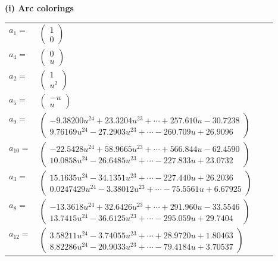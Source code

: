 \documentclass[1p]{elsarticle_modified}
\theoremstyle{definition}
\begin{document}
\flushleft \textbf{(i) Arc colorings}\\
\begin{tabular}{m{7pt} m{180pt} m{7pt} m{180pt} }
\flushright $a_{1}=$&$\begin{pmatrix}1\\0\end{pmatrix}$ \\
\flushright $a_{4}=$&$\begin{pmatrix}0\\u\end{pmatrix}$ \\
\flushright $a_{2}=$&$\begin{pmatrix}1\\u^2\end{pmatrix}$ \\
\flushright $a_{5}=$&$\begin{pmatrix}- u\\u\end{pmatrix}$ \\
\flushright $a_{9}=$&$\begin{pmatrix}-9.38200 u^{24}+23.3204 u^{23}+\cdots+257.610 u-30.7238\\9.76169 u^{24}-27.2903 u^{23}+\cdots-260.709 u+26.9096\end{pmatrix}$ \\
\flushright $a_{10}=$&$\begin{pmatrix}-22.5428 u^{24}+58.9665 u^{23}+\cdots+566.844 u-62.4590\\10.0858 u^{24}-26.6485 u^{23}+\cdots-227.833 u+23.0732\end{pmatrix}$ \\
\flushright $a_{3}=$&$\begin{pmatrix}15.1635 u^{24}-34.1351 u^{23}+\cdots-227.440 u+26.2036\\0.0247429 u^{24}-3.38012 u^{23}+\cdots-75.5561 u+6.67925\end{pmatrix}$ \\
\flushright $a_{8}=$&$\begin{pmatrix}-13.3618 u^{24}+32.6426 u^{23}+\cdots+291.960 u-33.5546\\13.7415 u^{24}-36.6125 u^{23}+\cdots-295.059 u+29.7404\end{pmatrix}$ \\
\flushright $a_{12}=$&$\begin{pmatrix}3.58211 u^{24}-3.74055 u^{23}+\cdots+28.9720 u+1.80463\\8.82286 u^{24}-20.9033 u^{23}+\cdots-79.4184 u+3.70537\end{pmatrix}$ \\

\end{tabular}
\end{document}

